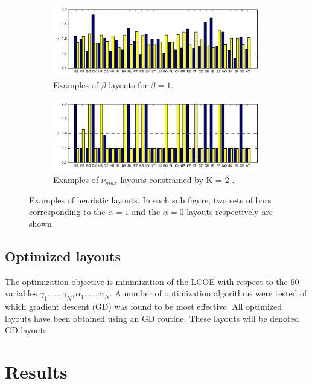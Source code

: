 \documentclass[a4paper, 5p, sort&compress]{elsarticle}%
\newcommand{\chromowidth}{1.00 \columnwidth}
\begin{document}
\begin{figure}[h!]
  \centering
  \begin{subfigure}{2\columnwidth}
    \includegraphics[width = \chromowidth, center]{beta=1}
    \caption{Examples of $\beta$ layouts for $\beta = 1$.}
    \label{fig:betaExamples}    
  \end{subfigure}
  \begin{subfigure}{2\columnwidth}
    \includegraphics[width = \chromowidth, center]{k=2cfMax}
    \caption{Examples of $\nu_{max}$ layouts constrained by K = 2 .}
    \label{fig:cfMaxExamples}    
  \end{subfigure}
  \caption{Examples of heuristic layouts. In each sub figure, two sets of bars
    corresponding to the $\alpha = 1$ and the $\alpha = 0$ layouts respectively
    are shown.}
  \label{fig:examples}
\end{figure}

\subsection{Optimized layouts}
\label{sec:optimized-layouts}

The optimization objective is minimization of the LCOE with respect to
the 60 variables
$\gamma_{1}, ..., \gamma_{N}, \alpha_{1}, ..., \alpha_{N}$.  A number of optimization
algorithms were tested of which gradient descent
(GD) %
was found to be most effective. All optimized layouts have been obtained
using an GD routine. These layouts will be denoted GD layouts.

\section{Results}
\label{sec:results}
\end{document}
